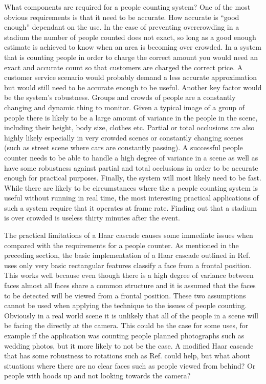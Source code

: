 \documentclass[conference]{IEEEtran}
\begin{document}
What components are required for a people counting system? One of the most obvious requirements is that it need to be accurate. How accurate is ``good enough'' dependant on the use. In the case of preventing overcrowding in a stadium the number of people counted does not exact, so long as a good enough estimate is achieved to know when an area is becoming over crowded. In a system that is counting people in order to charge the correct amount you would need an exact and accurate count so that customers are charged the correct price. A customer service scenario would probably demand a less accurate approximation but would still need to be accurate enough to be useful. Another key factor would be the system's robustness. Groups and crowds of people are a constantly changing and dynamic thing to monitor. Given a typical image of a group of people there is likely to be a large amount of variance in the people in the scene, including their height, body size, clothes etc. Partial or total occlusions are also highly likely especially in very crowded scenes or constantly changing scenes (such as street scene where cars are constantly passing). A successful people counter needs to be able to handle a high degree of variance in a scene as well as have some robustness against partial and total occlusions in order to be accurate enough for practical purposes. Finally, the system will most likely need to be fast. While there are likely to be circumstances where the a people counting system is useful without running in real time, the most interesting practical applications of such a system require that it operates at frame rate. Finding out that a stadium is over crowded is useless thirty minutes after the event.

The practical limitations of a Haar cascade causes some immediate issues when compared with the requirements for a people counter. As mentioned in the preceding section, the basic implementation of a Haar cascade outlined in Ref. \cite{viola2004robust} uses only very basic rectangular features classify a face from a frontal position. This works well because even though there is a high degree of variance between faces almost all faces share a common structure and it is assumed that the faces to be detected will be viewed from a frontal position. These two assumptions cannot be used when applying the technique to the issues of people counting. Obviously in a real world scene it is unlikely that all of the people in a scene will be facing the directly at the camera. This could be the case for some uses, for example if the application was counting people planned photographs such as wedding photos, but it more likely to not be the case. A modified Haar cascade that has some robustness to rotations such as Ref. \cite{jones2003fast} could help, but what about situations where there are no clear faces such as people viewed from behind? Or people with hoods up and not looking towards the camera? 
\end{document}

